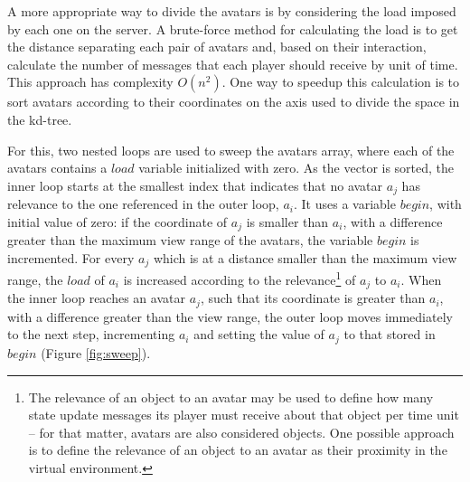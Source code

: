 \documentclass[acmjacm]{acmtrans2m}
\newcommand{\figurecaption}{Figure}
\begin{document}
A more appropriate way to divide the avatars is by considering the load imposed by each one on the server. A brute-force method for calculating the load is to get the distance separating each pair of avatars and, based on their interaction, calculate the number of messages that each player should receive by unit of time. This approach has complexity $O(n^2)$. One way to speedup this calculation is to sort avatars according to their coordinates on the axis used to divide the space in the kd-tree.

For this, two nested loops are used to sweep the avatars array, where each of the avatars contains a $load$ variable initialized with zero. As the vector is sorted, the inner loop starts at the smallest index that indicates that no avatar $a_j$ has relevance to the one referenced in the outer loop, $a_i$. It uses a variable $begin$, with initial value of zero: if the coordinate of $a_j$ is smaller than $a_i$, with a difference greater than the maximum view range of the avatars, the variable $begin$ is incremented. For every $a_j$ which is at a distance smaller than the maximum view range, the $load$ of $a_i$ is increased according to the relevance\footnote{The relevance of an object to an avatar may be used to define how many state update messages its player must receive about that object per time unit \cite{bezerra2008a3} -- for that matter, avatars are also considered objects. One possible approach is to define the relevance of an object to an avatar as their proximity in the virtual environment.} of $a_j$ to $a_i$. When the inner loop reaches an avatar $a_j$, such that its coordinate is greater than $a_i$, with a difference greater than the view range, the outer loop moves immediately to the next step, incrementing $a_i$ and setting the value of $a_j$ to that stored in $begin$ (\figurecaption{} \ref{fig:sweep}).
\end{document}
